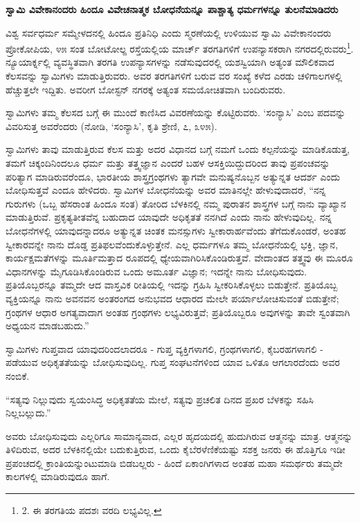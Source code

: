 \begin{center}
\textbf{ಸ್ವಾಮಿ ವಿವೇಕಾನಂದರು ಹಿಂದೂ ವಿವೇಚನಾತ್ಮಕ ಬೋಧನೆಯನ್ನೂ ಪಾಶ್ಚಾತ್ಯ ಧರ್ಮಗಳನ್ನೂ ತುಲನೆಮಾಡಿದರು}
\end{center}

ವಿಶ್ವ ಸರ್ವಧರ್ಮ ಸಮ್ಮೇಳದನಲ್ಲಿ ಹಿಂದೂ ಪ್ರತಿನಿಧಿ ಎಂದು ಸ್ಮರಣೆಯಲ್ಲಿ ಉಳಿಯುವ ಸ್ವಾಮಿ ವಿವೇಕಾನಂದರು ಪ್ರೋಕೋಪಿಯ, ೪೫ ಸಂತ ಬೋಟೋಲ್ಙ ರಸ್ತೆಯಲ್ಲಿಯ ಮಾರ್ಚ್ ತರಗತಿಗಳಿಗೆ ಉಪನ್ಯಾಸಕರಾಗಿ ನಗರದಲ್ಲಿರುವರು\footnote{2. ಈ ತರಗತಿಯ ಪದಶಃ ವರದಿ ಲಭ್ಯವಿಲ್ಲ.}. ನ್ಯೂಯಾರ್ಕ್ನಲ್ಲಿ ವ್ಯವಸ್ಥಿತವಾಗಿ ತರಗತಿ ಉಪನ್ಯಾಸಗಳನ್ನು ನಡೆಸುವುದರಲ್ಲಿ ಯಶಸ್ವಿಯಾಗಿ ಅತ್ಯಂತ ಮೌಲಿಕವಾದ ಕೆಲಸವನ್ನು ಸ್ವಾಮಿಗಳು ಮಾಡುತ್ತಿರುವರು. ಅವರ ತರಗತಿಗಳಿಗೆ ಬರುವ ವರ ಸಂಖ್ಯೆ ಕಳೆದ ಎರಡು ಚಳಿಗಾಲಗಳಲ್ಲಿ ಹೆಚ್ಚುತ್ತಲೇ ಇದ್ದಿತು. ಅವರೀಗ ಬೋಸ್ಟನ್ ನಗರಕ್ಕೆ ಅತ್ಯಂತ ಸಮಯೋಚಿತವಾಗಿ ಬಂದಿರುವರು.

ಸ್ವಾಮಿಗಳು ತಮ್ಮ ಕೆಲಸದ ಬಗ್ಗೆ ಈ ಮುಂದೆ ಕಾಣಿಸಿದ ವಿವರಣೆಯನ್ನು ಕೊಟ್ಟಿರುವರು. ‘ಸಂನ್ಯಾಸಿ’ ಎಂಬ ಪದವನ್ನು ವಿವರಿಸುತ್ತ ಅವರೆಂದರು (ನೋಡಿ, ‘ಸಂನ್ಯಾಸಿ’, ಕೃತಿ ಶ್ರೇಣಿ, ೭, ೩೪೫).

ಸ್ವಾಮಿಗಳು ತಾವು ಮಾಡುತ್ತಿರುವ ಕೆಲಸ ಮತ್ತು ಅದರ ವಿಧಾನದ ಬಗ್ಗೆ ನಮಗೆ ಒಂದು ಕಲ್ಪನೆಯನ್ನು ಮಾಡಿಕೊಡುತ್ತ, ತಮಗೆ ಚಿಕ್ಕಂದಿನಿಂದಲೂ ಧರ್ಮ ಮತ್ತು ತತ್ತ್ವಜ್ಞಾನ ಎಂದರೆ ಬಹಳ ಆಸಕ್ತಿಯಿದ್ದುದರಿಂದ ತಾವು ಪ್ರಪಂಚವನ್ನು ಪರಿತ್ಯಾಗ ಮಾಡಿರುವರೆಂದೂ, ಭಾರತೀಯ ಶಾಸ್ತ್ರಗ್ರಂಥಗಳು ತ್ಯಾಗವೇ ಮನುಷ್ಯನೊಬ್ಬನ ಅತ್ಯುನ್ನತ ಆದರ್ಶ ಎಂದು ಬೋಧಿಸುತ್ತವೆ ಎಂದೂ ಹೇಳಿದರು. ಸ್ವಾಮಿಗಳ ಬೋಧನೆಯನ್ನು ಅವರ ಮಾತಿನಲ್ಲೇ ಹೇಳುವುದಾದರೆ, “ನನ್ನ ಗುರುಗಳು (ಒಬ್ಬ ಹೆಸರಾಂತ ಹಿಂದೂ ಸಂತ) ತೋರಿದ ಬೆಳಕಿನಲ್ಲಿ ನಮ್ಮ ಪುರಾತನ ಶಾಸ್ತ್ರಗಳ ಬಗ್ಗೆ ನಾನು ವ್ಯಾಖ್ಯಾನ ಮಾಡುತ್ತಿರುವೆ. ಪ್ರಕೃತ್ಯತೀತವೆನ್ನ ಬಹುದಾದ ಯಾವುದೇ ಅಧಿಕೃತತೆ ನನಗಿದೆ ಎಂದು ನಾನು ಹೇಳುವುದಿಲ್ಲ. ನನ್ನ ಬೋಧನೆಗಳಲ್ಲಿ ಯಾವುದನ್ನಾದರೂ ಅತ್ಯುನ್ನತ ಚಿಂತಕ ಮನಸ್ಸುಗಳು ಸ್ವೀಕಾರಾರ್ಹವೆಂದು ತೆಗೆದುಕೊಂಡರೆ, ಅಂತಹ ಸ್ವೀಕಾರವನ್ನೇ ನಾನು ದೊಡ್ಡ ಪ್ರತಿಫಲವೆಂದುಕೊಳ್ಳುತ್ತೇನೆ. ಎಲ್ಲ ಧರ್ಮಗಳೂ ತಮ್ಮ ಬೋಧನೆಯಲ್ಲಿ ಭಕ್ತಿ, ಜ್ಞಾನ, ಕಾರ್ಯಕ್ಷಮತೆಗಳನ್ನು ಮೂರ್ತಿಮತ್ತಾದ ರೂಪದಲ್ಲಿ ಧ್ಯೇಯವಾಗಿರಿಸಿಕೊಂಡಿರುತ್ತವೆ. ವೇದಾಂತದ ತತ್ತ್ವವು ಈ ಮೂರೂ ವಿಧಾನಗಳನ್ನು ಮೈಗೂಡಿಸಿಕೊಂಡಿರುವ ಒಂದು ಅಮೂರ್ತ ವಿಜ್ಞಾನ; ಇದನ್ನೇ ನಾನು ಬೋಧಿಸುವುದು. ಪ್ರತಿಯೊಬ್ಬರನ್ನೂ ತಮ್ಮದೇ ಆದ ವಾಸ್ತವಿಕ ರೀತಿಯಲ್ಲಿ ಇದನ್ನು ಗ್ರಹಿಸಿ ಸ್ವೀಕರಿಸಿಕೊಳ್ಳಲು ಬಿಡುತ್ತೇನೆ. ಪ್ರತಿಯೊಬ್ಬ ವ್ಯಕ್ತಿಯನ್ನೂ ನಾನು ಅವನವನ ಅಂತರಂಗದ ಅನುಭವದ ಆಧಾರದ ಮೇಲೇ ಪರ್ಯಾಲೋಚಿಸುವಂತೆ ಬಿಡುತ್ತೇನೆ; ಗ್ರಂಥಗಳ ಆಧಾರ ಅಗತ್ಯವಾದಾಗ ಅಂತಹ ಗ್ರಂಥಗಳು ಲಭ್ಯವಿರುತ್ತವೆ; ಪ್ರತಿಯೊಬ್ಬರೂ ಅವುಗಳನ್ನು ತಾವೇ ಸ್ವಂತವಾಗಿ ಅಧ್ಯಯನ ಮಾಡಬಹುದು.”

ಸ್ವಾಮಿಗಳು ಗುಪ್ತವಾದ ಯಾವುದರಿಂದಲಾದರೂ - ಗುಪ್ತ ವ್ಯಕ್ತಿಗಳಾಗಲಿ, ಗ್ರಂಥಗಳಾಗಲಿ, ಕೈಬರಹಗಳಾಗಲಿ - ಪಡೆಯುವ ಅಧಿಕೃತತೆಯನ್ನು ಬೋಧಿಸುವುದಿಲ್ಲ. ಗುಪ್ತ ಸಂಘಟನೆಗಳಿಂದ ಯಾವ ಒಳಿತೂ ಆಗಲಾರದೆಂದು ಅವರ ನಂಬಿಕೆ.

“ಸತ್ಯವು ನಿಲ್ಲುವುದು ಸ್ವಯಂಸಿದ್ಧ ಅಧಿಕೃತತೆಯ ಮೇಲೆ, ಸತ್ಯವು ಪ್ರಚಲಿತ ದಿನದ ಪ್ರಖರ ಬೆಳಕನ್ನು ಸಹಿಸಿ ನಿಲ್ಲಬಲ್ಲುದು.”

ಅವರು ಬೋಧಿಸುವುದು ಎಲ್ಲರಿಗೂ ಸಾಮಾನ್ಯವಾದ, ಎಲ್ಲರ ಹೃದಯದಲ್ಲಿ ಹುದುಗಿರುವ ಆತ್ಮನನ್ನು ಮಾತ್ರ. ಆತ್ಮನನ್ನು ತಿಳಿದಿರುವ, ಅದರ ಬೆಳಕಿನಲ್ಲಿಯೇ ಬದುಕುತ್ತಿರುವ, ಒಂದು ಕೈಬೆರಳೆಣಿಕೆಯಷ್ಟು ಸಶಕ್ತ ಜನರು ಈ ಹೊತ್ತಿಗೂ ಇಡೀ ಪ್ರಪಂಚದಲ್ಲಿ ಕ್ರಾಂತಿಯನ್ನುಂಟುಮಾಡಿ ಬಿಡಬಲ್ಲರು - ಹಿಂದೆ ಏಕಾಂಗಿಗಳಾದ ಅಂತಹ ಮಹಾ ಸಮರ್ಥರು ತಮ್ಮದೇ ಕಾಲಗಳಲ್ಲಿ ಮಾಡಿರುವುದೂ ಹಾಗೆ.

